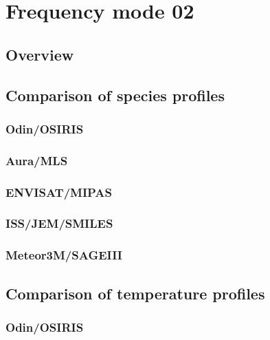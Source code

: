 \section{Frequency mode 02}
\label{sec:fm02}

\subsection{Overview}
\label{sec:fm02:overview}

\subsection{Comparison of species profiles}
\label{sec:fm02:comparison:species}

\subsubsection{Odin/OSIRIS}
\label{sec:fm02:comparison:species:osiris}

\subsubsection{Aura/MLS}
\label{sec:fm02:comparison:species:mls}

\subsubsection{ENVISAT/MIPAS}
\label{sec:fm02:comparison:species:mipas}

\subsubsection{ISS/JEM/SMILES}
\label{sec:fm02:comparison:species:smiles}

\subsubsection{Meteor3M/SAGEIII}
\label{sec:fm02:comparison:species:sage3}


\subsection{Comparison of temperature profiles}
\label{sec:fm02:comparison:temperature}

\subsubsection{Odin/OSIRIS}
\label{sec:fm02:comparison:temperature:osiris}

